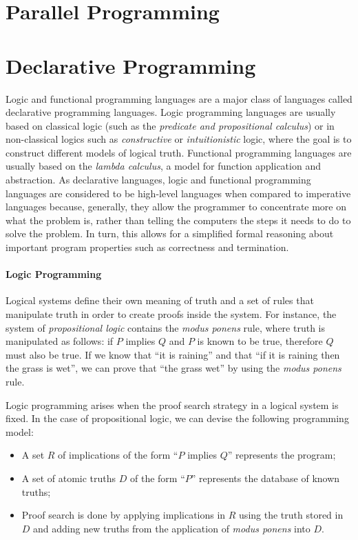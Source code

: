 \section{Parallel Programming}


\section{Declarative Programming}

Logic and functional programming languages are a major class of languages called
declarative programming languages. Logic programming languages are usually based
on classical logic (such as the \emph{predicate and propositional calculus}) or
in non-classical logics such as \emph{constructive} or \emph{intuitionistic}
logic, where the goal is to construct different models of logical truth.
Functional programming languages are usually based on the \emph{lambda
calculus}, a model for function application and abstraction. As declarative
languages, logic and functional programming languages are considered to be
high-level languages when compared to imperative languages because, generally,
they allow the programmer to concentrate more on what the problem is, rather
than telling the computers the steps it needs to do to solve the problem.  In
turn, this allows for a simplified formal reasoning about important program
properties such as correctness and termination.

\paragraph{Logic Programming}

Logical systems define their own meaning of truth and a set of rules that
manipulate truth in order to create proofs inside the system.  For instance, the
system of \emph{propositional logic} contains the \emph{modus ponens} rule,
where truth is manipulated as follows: if $P$ implies $Q$ and $P$ is known to be
true, therefore $Q$ must also be true. If we know that ``it is raining'' and
that ``if it is raining then the grass is wet'', we can prove that ``the grass
wet'' by using the \emph{modus ponens} rule.

Logic programming arises when the proof search strategy in a logical system is
fixed. In the case of propositional logic, we can devise the following
programming model:

\begin{itemize}
   \item A set $R$ of implications of the form ``$P$ implies $Q$'' represents the
      program;
   \item A set of atomic truths $D$ of the form ``$P$'' represents the database of
      known truths;
   \item Proof search is done by applying implications in $R$ using the truth
      stored in $D$ and adding new truths from the application of \emph{modus
      ponens} into $D$.
\end{itemize}

